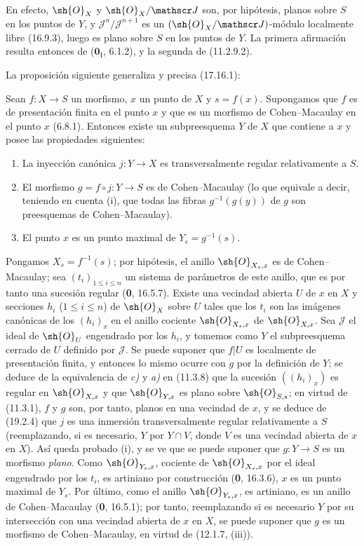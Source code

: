 En efecto, $\sh{O}_X$ y $\sh{O}_X/\mathscr J$ son, por hipótesis, planos sobre $S$ en los puntos de $Y$, y $\mathscr J^n/\mathscr J^{n+1}$ es un $(\sh{O}_X/\mathscr J)$-módulo localmente libre (16.9.3), luego es plano sobre $S$ en los puntos de $Y$. La primera afirmación resulta entonces de ($\mathbf{0}_{\mathrm I}$, 6.1.2), y la segunda de (11.2.9.2).

La proposición siguiente generaliza y precisa (17.16.1):

\begin{proposition}[19.2.9]
\label{IV.19.2.9}
Sean $f:X\to S$ un morfismo, $x$ un punto de $X$ y $s=f(x)$. Supongamos que $f$ es de presentación finita en el punto $x$ y que es un morfismo de Cohen--Macaulay en el punto $x$ \textup{(6.8.1)}. Entonces existe un subpreesquema $Y$ de $X$ que contiene a $x$ y posee las propiedades siguientes:
\begin{enumerate}
  \item[\textup{(i)}] La inyección canónica $j:Y\to X$ es transversalmente regular relativamente a $S$.
  \item[\textup{(ii)}] El morfismo $g=f\circ j:Y\to S$ es de Cohen--Macaulay \textup{(lo que equivale a decir, teniendo en cuenta (i), que todas las fibras $g^{-1}(g(y))$ de $g$ son preesquemas de Cohen--Macaulay)}.
  \item[\textup{(iii)}] El punto $x$ es un punto maximal de $Y_s=g^{-1}(s)$.
\end{enumerate}
\end{proposition}

Pongamos $X_s=f^{-1}(s)$; por hipótesis, el anillo $\sh{O}_{X_s,x}$ es de Cohen--Macaulay; sea $(t_i)_{1\leq i\leq n}$ un sistema de parámetros de este anillo, que es por tanto una sucesión regular (\textbf{0}, 16.5.7). Existe una vecindad abierta $U$ de $x$ en $X$ y secciones $h_i$ ($1\leq i\leq n$) de $\sh{O}_X$ sobre $U$ tales que los $t_i$ son las imágenes canónicas de los $(h_i)_x$ en el anillo cociente $\sh{O}_{X_s,x}$ de $\sh{O}_{X,x}$. Sea $\mathscr J$ el ideal de $\sh{O}_U$ engendrado por los $h_i$, y tomemos como $Y$ el subpreesquema cerrado de $U$ definido por $\mathscr J$. Se puede suponer que $f|U$ es localmente de presentación finita, y entonces lo mismo ocurre con $g$ por la definición de $Y$; se deduce de la equivalencia de \emph{c)} y \emph{a)} en (11.3.8) que la sucesión $((h_i)_x)$ es regular en $\sh{O}_{X,x}$ y que $\sh{O}_{Y,x}$ es plano sobre $\sh{O}_{S,s}$; en virtud de (11.3.1), $f$ y $g$ son, por tanto, planos en una vecindad de $x$, y se deduce de (19.2.4) que $j$ es una inmersión transversalmente regular relativamente a $S$ (reemplazando, si es necesario, $Y$ por $Y\cap V$, donde $V$ es una vecindad abierta de $x$ en $X$). Así queda probado (i), y se ve que se puede suponer que $g:Y\to S$ es un morfismo \emph{plano}. Como $\sh{O}_{Y_s,x}$, cociente de $\sh{O}_{X_s,x}$ por el ideal engendrado por los $t_i$, es artiniano por construcción (\textbf{0}, 16.3.6), $x$ es un punto maximal de $Y_s$. Por último, como el anillo $\sh{O}_{Y_s,x}$, es artiniano, es un anillo de Cohen--Macaulay (\textbf{0}, 16.5.1); por tanto, reemplazando si es necesario $Y$ por su intersección con una vecindad abierta de $x$ en $X$, se puede suponer que $g$ es un morfismo de Cohen--Macaulay, en virtud de (12.1.7, (iii)).

